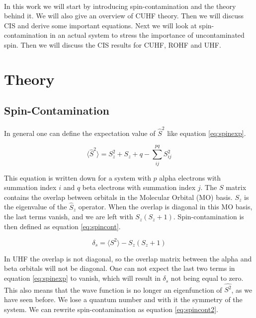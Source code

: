 \documentclass[twoside,twocolumn,9pt]{article}
\begin{document}
\paragraph*{}
In this work we will start by introducing spin-contamination and the theory behind it. We will also give an overview of CUHF theory. Then we will discuss CIS and derive some important
equations. Next we will look at spin-contamination in an actual system to stress the importance of uncontaminated spin. Then we will discuss the CIS results for CUHF, ROHF and UHF.
\section{Theory}
\subsection{Spin-Contamination}
\label{subsec:spinconttheory}
In general one can define the expectation value of $\hat{S}^2$ like equation \eqref{eq:spinexp}\cite{Andrews1991}.

\begin{equation}\label{eq:spinexp}
  \langle \hat{S}^2 \rangle = S_z^2 + S_z + q - \sum_{ij}^{pq} S_{ij}^2
\end{equation}

This equation is written down for a system with $p$ alpha electrons with summation index $i$ and $q$ beta electrons with summation index $j$. The $S$ matrix contains the overlap 
between orbitals in the Molecular Orbital (MO)
basis. $S_z$ is the eigenvalue of the $\hat{S}_z$ operator. When the overlap is diagonal in this MO basis, the last terms vanish, and we are left with $S_z(S_z + 1)$.
Spin-contamination is then defined as equation \eqref{eq:spincont}.

\begin{equation}\label{eq:spincont}
  \delta_s = \langle S^2 \rangle - S_z(S_z + 1)
\end{equation}

In UHF the overlap is not diagonal, so the overlap matrix between the alpha and beta orbitals will not be diagonal. One can not
expect the last two terms in equation \eqref{eq:spinexp} to vanish, which will result in $\delta_s$ not being equal to zero. This also means that the wave function is no longer an
eigenfunction of $\hat{S^2}$, as we have seen before. We lose a quantum number and with it the symmetry of the system. We can rewrite spin-contamination as equation
\eqref{eq:spincont2}\cite{Savin2010}.
\end{document}
